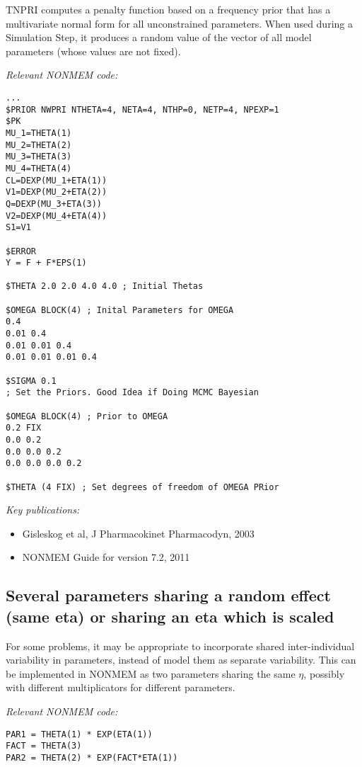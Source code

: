 \documentclass[a4paper,11pt]{article}
\begin{document}
TNPRI computes a penalty function based on a frequency prior that has
a multivariate normal form for all unconstrained parameters.  When
used during a Simulation Step, it produces a random value of the
vector of all model parameters (whose values are not fixed).  

\vspace{10pt}

\noindent \emph{Relevant NONMEM code:}
\begin{lstlisting}
...
$PRIOR NWPRI NTHETA=4, NETA=4, NTHP=0, NETP=4, NPEXP=1
$PK
MU_1=THETA(1)
MU_2=THETA(2)
MU_3=THETA(3)
MU_4=THETA(4)
CL=DEXP(MU_1+ETA(1))
V1=DEXP(MU_2+ETA(2))
Q=DEXP(MU_3+ETA(3))
V2=DEXP(MU_4+ETA(4))
S1=V1

$ERROR
Y = F + F*EPS(1)

$THETA 2.0 2.0 4.0 4.0 ; Initial Thetas

$OMEGA BLOCK(4) ; Inital Parameters for OMEGA
0.4
0.01 0.4
0.01 0.01 0.4
0.01 0.01 0.01 0.4

$SIGMA 0.1
; Set the Priors. Good Idea if Doing MCMC Bayesian

$OMEGA BLOCK(4) ; Prior to OMEGA
0.2 FIX
0.0 0.2
0.0 0.0 0.2
0.0 0.0 0.0 0.2

$THETA (4 FIX) ; Set degrees of freedom of OMEGA PRior
\end{lstlisting}

\noindent \emph{Key publications:}
\begin{itemize}
\item Gisleskog et al, J Pharmacokinet Pharmacodyn, 2003
\item NONMEM Guide for version 7.2, 2011
\end{itemize}

\subsection{Several parameters sharing a random effect (same eta) or sharing an eta which is scaled}
For some problems, it may be appropriate to incorporate shared
inter-individual variability in parameters, instead of model them as
separate variability. This can be implemented in NONMEM as two
parameters sharing the same $\eta$, possibly with different multiplicators for
different parameters.

\vspace{10pt}
\noindent \emph{Relevant NONMEM code:}
\begin{lstlisting}
PAR1 = THETA(1) * EXP(ETA(1))
FACT = THETA(3)
PAR2 = THETA(2) * EXP(FACT*ETA(1))
\end{lstlisting}
 
\end{document}
